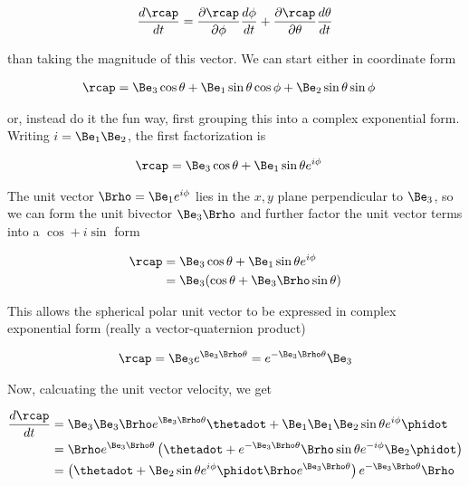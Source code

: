 \begin{align}\label{eqn:sphericalPolarUnit:yoo1a}
\frac{d\rcap}{dt} = \PD{\phi}{\rcap} \frac{d\phi}{dt} 
+\PD{\theta}{\rcap} \frac{d\theta}{dt}
\end{align}

than taking the magnitude of this vector.  We can start either in coordinate form

\begin{align}\label{eqn:sphericalPolarUnit:yoo1}
\rcap 
&= \Be_3 \cos\theta + \Be_1 \sin\theta \cos\phi + \Be_2 \sin\theta \sin\phi
\end{align}

or, instead do it the fun way, first grouping this into a complex exponential form.  Writing $i = \Be_1 \Be_2$, the first factorization is

\begin{align}\label{eqn:sphericalPolarUnit:yoo2}
\rcap 
&= \Be_3 \cos\theta + \Be_1 \sin\theta e^{i\phi} 
\end{align}

The unit vector $\Brho = \Be_1 e^{i\phi}$ lies in the $x,y$ plane perpendicular to $\Be_3$, so we can form the unit bivector $\Be_3\Brho$ and further factor the unit vector terms into a $\cos + i \sin$ form

\begin{align*}
\rcap 
&= \Be_3 \cos\theta + \Be_1 \sin\theta e^{i\phi} \\
&= \Be_3 (\cos\theta + \Be_3 \Brho \sin\theta) \\
\end{align*}

This allows the spherical polar unit vector to be expressed in complex exponential form (really a vector-quaternion product)

\begin{align}\label{eqn:sphericalPolarUnit:yoo3}
\rcap = \Be_3 e^{\Be_3 \Brho \theta} = e^{-\Be_3 \Brho \theta} \Be_3
\end{align}

Now, calcuating the unit vector velocity, we get

\begin{align*}
\frac{d\rcap}{dt} 
&= \Be_3 \Be_3 \Brho e^{\Be_3 \Brho \theta} \thetadot + \Be_1 \Be_1 \Be_2 \sin\theta e^{i\phi} \phidot \\
&= \Brho e^{\Be_3 \Brho \theta} \left(\thetadot + e^{-\Be_3 \Brho \theta} \Brho \sin\theta e^{-i\phi} \Be_2 \phidot\right) \\
&= \left( \thetadot + \Be_2 \sin\theta e^{i\phi} \phidot \Brho e^{\Be_3 \Brho \theta} \right) e^{-\Be_3 \Brho \theta} \Brho
\end{align*}


